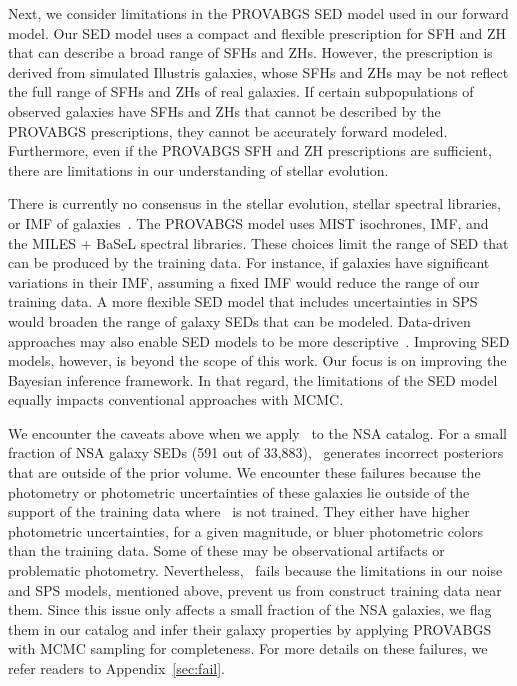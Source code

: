 Next, we consider limitations in the PROVABGS SED model used in our forward
model. 
Our SED model uses a compact and flexible prescription for SFH and ZH that can
describe a broad range of SFHs and ZHs.
However, the prescription is derived from simulated Illustris galaxies, whose
SFHs and ZHs may be not reflect the full range of SFHs and ZHs of real
galaxies.
If certain subpopulations of observed galaxies have SFHs and ZHs that cannot be
described by the PROVABGS prescriptions, they cannot be accurately forward
modeled. 
Furthermore, even if the PROVABGS SFH and ZH prescriptions are sufficient,
there are limitations in our understanding of stellar evolution. 

There is currently no consensus in the stellar evolution, stellar spectral
libraries, or IMF of galaxies~\citep[\emph{e.g.}][]{treu2010, vandokkum2010,
rosani2018, ge2019, sonnenfeld2019}.
The PROVABGS model uses MIST isochrones, \cite{chabrier2003} IMF, and the MILES
+ BaSeL spectral libraries. 
These choices limit the range of SED that can be produced by the training data. 
For instance, if galaxies have significant variations in their IMF, assuming a
fixed IMF would reduce the range of our training data.  
A more flexible SED model that includes uncertainties in SPS would broaden the
range of galaxy SEDs that can be modeled.
Data-driven approaches may also enable SED models to be more
descriptive~\citep[\emph{e.g.}][]{hogg2016, portillo2020}. 
Improving  SED models, however, is beyond the scope of this work. 
Our focus is on improving the Bayesian inference framework.
In that regard, the limitations of the SED model equally impacts conventional
approaches with MCMC. 

We encounter the caveats above when we apply \sedflow~to the NSA catalog. 
For a small fraction of NSA galaxy SEDs (591 out of 33,883), \sedflow~generates
incorrect posteriors that are outside of the prior volume. 
We encounter these failures because the photometry or photometric uncertainties
of these galaxies lie outside of the support of the training data where
\sedflow~is not trained. 
They either have higher photometric uncertainties, for a given magnitude, or
bluer photometric colors than the training data. 
Some of these may be observational artifacts or problematic photometry.
Nevertheless, \sedflow~fails because the limitations in our noise and SPS
models, mentioned above, prevent us from construct training data near them. 
Since this issue only affects a small fraction of the NSA galaxies, we flag
them in our catalog and infer their galaxy properties by applying PROVABGS with
MCMC sampling for completeness.
For more details on these failures, we refer readers to
Appendix~\ref{sec:fail}.

